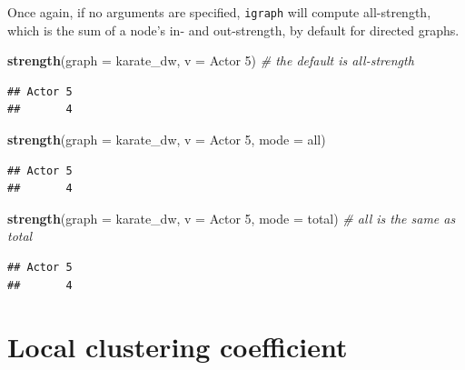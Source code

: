 \documentclass[
]{book}
\newenvironment{Shaded}{\begin{snugshade}}{\end{snugshade}}
\newcommand{\AttributeTok}[1]{\textcolor[rgb]{0.13,0.29,0.53}{#1}}
\newcommand{\CommentTok}[1]{\textcolor[rgb]{0.56,0.35,0.01}{\textit{#1}}}
\newcommand{\FunctionTok}[1]{\textcolor[rgb]{0.13,0.29,0.53}{\textbf{#1}}}
\newcommand{\NormalTok}[1]{#1}
\newcommand{\StringTok}[1]{\textcolor[rgb]{0.31,0.60,0.02}{#1}}
\begin{document}
Once again, if no arguments are specified, \texttt{igraph} will compute all-strength, which is the sum of a node's in- and out-strength, by default for directed graphs.

\begin{Shaded}
\begin{Highlighting}[]
\FunctionTok{strength}\NormalTok{(}\AttributeTok{graph =}\NormalTok{ karate\_dw, }\AttributeTok{v =} \StringTok{\textquotesingle{}Actor 5\textquotesingle{}}\NormalTok{) }\CommentTok{\# the default is all{-}strength}
\end{Highlighting}
\end{Shaded}

\begin{verbatim}
## Actor 5 
##       4
\end{verbatim}

\begin{Shaded}
\begin{Highlighting}[]
\FunctionTok{strength}\NormalTok{(}\AttributeTok{graph =}\NormalTok{ karate\_dw, }\AttributeTok{v =} \StringTok{\textquotesingle{}Actor 5\textquotesingle{}}\NormalTok{, }\AttributeTok{mode =} \StringTok{\textquotesingle{}all\textquotesingle{}}\NormalTok{) }
\end{Highlighting}
\end{Shaded}

\begin{verbatim}
## Actor 5 
##       4
\end{verbatim}

\begin{Shaded}
\begin{Highlighting}[]
\FunctionTok{strength}\NormalTok{(}\AttributeTok{graph =}\NormalTok{ karate\_dw, }\AttributeTok{v =} \StringTok{\textquotesingle{}Actor 5\textquotesingle{}}\NormalTok{, }\AttributeTok{mode =} \StringTok{\textquotesingle{}total\textquotesingle{}}\NormalTok{) }\CommentTok{\# all is the same as total}
\end{Highlighting}
\end{Shaded}

\begin{verbatim}
## Actor 5 
##       4
\end{verbatim}

\section{Local clustering coefficient}\label{local-clustering-coefficient}
\end{document}
